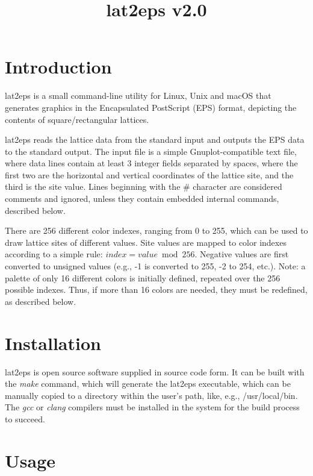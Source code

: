 \documentclass[a4paper]{article}
\title{\vspace{-5ex}lat2eps v2.0}
\author{}
\date{\vspace{-5ex}}
\begin{document}
\maketitle


\section{Introduction}

lat2eps is a small command-line utility for Linux, Unix and macOS that generates graphics in the Encapsulated PostScript (EPS) format, depicting the contents of square/rectangular lattices.
\bigbreak

lat2eps reads the lattice data from the standard input and outputs the EPS data to the standard output. The input file is a simple Gnuplot-compatible text file, where data lines contain at least 3 integer fields separated by spaces, where the first two are the horizontal and vertical coordinates of the lattice site, and the third is the site value. Lines beginning with the \# character are considered comments and ignored, unless they contain embedded internal commands, described below.
\bigbreak

There are 256 different color indexes, ranging from 0 to 255, which can be used to draw lattice sites of different values. Site values are mapped to color indexes according to a simple rule: $index = value \bmod 256$. Negative values are first converted to unsigned values (e.g., -1 is converted to 255, -2 to 254, etc.). Note: a palette of only 16 different colors is initially defined, repeated over the 256 possible indexes. Thus, if more than 16 colors are needed, they must be redefined, as described below.
\bigbreak


\section{Installation}

lat2eps is open source software supplied in source code form. It can be built with the \textit{make} command, which will generate the lat2eps executable, which can be manually copied to a directory within the user's path, like, e.g., /usr/local/bin. The \textit{gcc} or \textit{clang} compilers must be installed in the system for the build process to succeed.
\bigbreak


\section{Usage}
\end{document}
